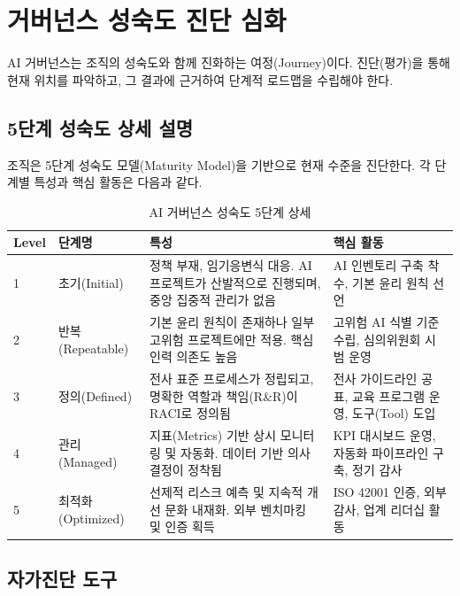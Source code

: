 \section{거버넌스 성숙도 진단 심화}
\label{sec:8.6}

AI 거버넌스는 조직의 성숙도와 함께 진화하는 여정(Journey)이다. 진단(평가)을 통해 현재 위치를 파악하고, 그 결과에 근거하여 단계적 로드맵을 수립해야 한다.

\subsection{5단계 성숙도 상세 설명}
\label{sec:8.6.1}

조직은 5단계 성숙도 모델(Maturity Model)을 기반으로 현재 수준을 진단한다. 각 단계별 특성과 핵심 활동은 다음과 같다.

\begin{table}[htbp]
\centering
\caption{AI 거버넌스 성숙도 5단계 상세}
\label{tab:maturity_detail}
\begin{tabularx}{\textwidth}{p{1cm}p{2cm}Xp{3.5cm}}
\toprule
\textbf{Level} & \textbf{단계명} & \textbf{특성} & \textbf{핵심 활동} \\
\midrule
1 & 초기(Initial) & 정책 부재, 임기응변식 대응. AI 프로젝트가 산발적으로 진행되며, 중앙 집중적 관리가 없음 & AI 인벤토리 구축 착수, 기본 윤리 원칙 선언 \\
\midrule
2 & 반복(Repeatable) & 기본 윤리 원칙이 존재하나 일부 고위험 프로젝트에만 적용. 핵심 인력 의존도 높음 & 고위험 AI 식별 기준 수립, 심의위원회 시범 운영 \\
\midrule
3 & 정의(Defined) & 전사 표준 프로세스가 정립되고, 명확한 역할과 책임(R\&R)이 RACI로 정의됨 & 전사 가이드라인 공표, 교육 프로그램 운영, 도구(Tool) 도입 \\
\midrule
4 & 관리(Managed) & 지표(Metrics) 기반 상시 모니터링 및 자동화. 데이터 기반 의사결정이 정착됨 & KPI 대시보드 운영, 자동화 파이프라인 구축, 정기 감사 \\
\midrule
5 & 최적화(Optimized) & 선제적 리스크 예측 및 지속적 개선 문화 내재화. 외부 벤치마킹 및 인증 획득 & ISO 42001 인증, 외부 감사, 업계 리더십 활동 \\
\bottomrule
\end{tabularx}
\end{table}

\subsection{자가진단 도구}
\label{sec:8.6.2}

